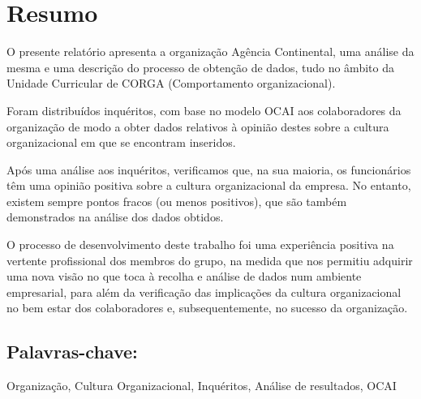 
\section*{Resumo}

O presente relatório apresenta a organização Agência Continental, uma análise da mesma e uma descrição do processo de obtenção de dados, tudo no âmbito da Unidade Curricular de CORGA (Comportamento organizacional).

Foram distribuídos inquéritos, com base no modelo OCAI aos colaboradores da organização de modo a obter dados relativos à opinião destes sobre a cultura organizacional em que se encontram inseridos.

Após uma análise aos inquéritos, verificamos que, na sua maioria, os funcionários têm uma opinião positiva sobre a cultura organizacional da empresa. No entanto, existem sempre pontos fracos (ou menos positivos), que são também demonstrados na análise dos dados obtidos.

O processo de desenvolvimento deste trabalho foi uma experiência positiva na vertente profissional dos membros do grupo, na medida que nos permitiu adquirir uma nova visão no que toca à recolha e análise de dados num ambiente empresarial, para além da verificação das implicações da cultura organizacional no bem estar dos colaboradores e, subsequentemente, no sucesso da organização.

\subsection*{Palavras-chave:} 

Organização, Cultura Organizacional, Inquéritos, Análise de resultados, OCAI